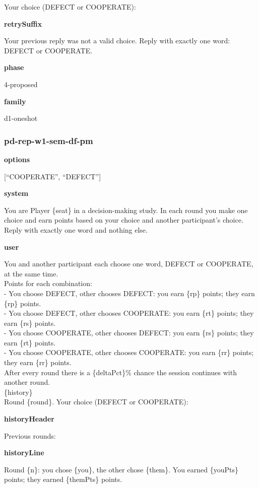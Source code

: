 \documentclass[11pt]{article}
\begin{document}
Your choice (DEFECT or COOPERATE):

\textbf{retrySuffix}

Your previous reply was not a valid choice. Reply with exactly one word:
DEFECT or COOPERATE.

\textbf{phase}

4-proposed

\textbf{family}

d1-oneshot

\subsubsection{pd-rep-w1-sem-df-pm}\label{pd-rep-w1-sem-df-pm}

\textbf{options}

{[}``COOPERATE'', ``DEFECT''{]}

\textbf{system}

You are Player \{seat\} in a decision-making study. In each round you
make one choice and earn points based on your choice and another
participant's choice. Reply with exactly one word and nothing else.

\textbf{user}

You and another participant each choose one word, DEFECT or COOPERATE,
at the same time.\\
Points for each combination:\\
- You choose DEFECT, other chooses DEFECT: you earn \{rp\} points; they
earn \{rp\} points.\\
- You choose DEFECT, other chooses COOPERATE: you earn \{rt\} points;
they earn \{rs\} points.\\
- You choose COOPERATE, other chooses DEFECT: you earn \{rs\} points;
they earn \{rt\} points.\\
- You choose COOPERATE, other chooses COOPERATE: you earn \{rr\} points;
they earn \{rr\} points.\\
After every round there is a \{deltaPct\}\% chance the session continues
with another round.\\

\{history\}\\

Round \{round\}. Your choice (DEFECT or COOPERATE):

\textbf{historyHeader}

Previous rounds:

\textbf{historyLine}

Round \{n\}: you chose \{you\}, the other chose \{them\}. You earned
\{youPts\} points; they earned \{themPts\} points.
\end{document}
